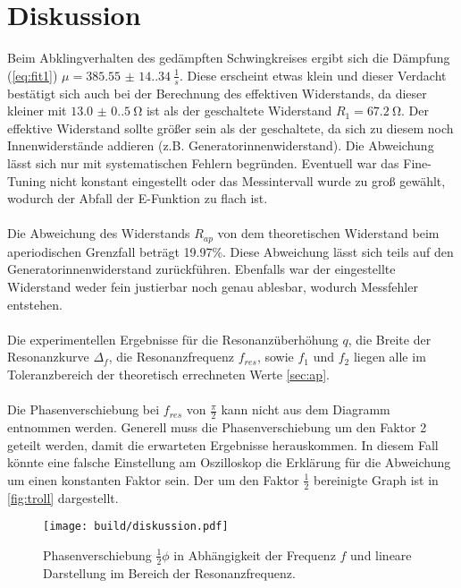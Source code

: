\section{Diskussion}
\label{sec:Diskussion}
Beim Abklingverhalten des gedämpften Schwingkreises ergibt sich die Dämpfung (\autoref{eq:fit1}) 
$\mu = \SI{385.55(14.34)}{\frac{1}{s}}$. Diese erscheint etwas klein und dieser Verdacht
bestätigt sich auch bei der Berechnung des effektiven Widerstands, da dieser kleiner mit
$\SI{13.0(0.5)}{\ohm}$ ist als der geschaltete Widerstand $R_1 = \SI{67.2}{\ohm}$.
Der effektive Widerstand sollte größer sein als der geschaltete, da sich zu diesem noch
Innenwiderstände addieren (z.B. Generatorinnenwiderstand). Die Abweichung lässt sich nur mit
systematischen Fehlern begründen. Eventuell war das Fine-Tuning nicht konstant eingestellt
oder das Messintervall wurde zu groß gewählt, wodurch der Abfall der E-Funktion zu flach ist.
\\
\\
Die Abweichung des Widerstands $R_{ap}$ von dem theoretischen Widerstand beim aperiodischen
Grenzfall beträgt 19.97\%. Diese Abweichung lässt sich teils auf den Generatorinnenwiderstand
zurückführen. Ebenfalls war der eingestellte Widerstand weder fein justierbar noch genau ablesbar, 
wodurch Messfehler entstehen.
\\
\\
Die experimentellen Ergebnisse für die Resonanzüberhöhung $q$, die Breite der Resonanzkurve 
$\Delta_f$, die Resonanzfrequenz $f_{res}$, sowie $f_1$ und $f_2$ liegen alle im Toleranzbereich
der theoretisch errechneten Werte \autoref{sec:ap}.
\\
\\
Die Phasenverschiebung bei $f_{res}$ von $\frac{\pi}{2}$ kann nicht aus dem Diagramm entnommen werden.
Generell muss die Phasenverschiebung um den Faktor 2 geteilt werden, damit die erwarteten 
Ergebnisse herauskommen. In diesem Fall könnte eine falsche Einstellung am Oszilloskop
die Erklärung für die Abweichung um einen konstanten Faktor sein.
Der um den Faktor $\frac{1}{2}$ bereinigte Graph ist in \autoref{fig:troll} dargestellt.
\begin{figure}[H]
    \texttt{[image: build/diskussion.pdf]}
    \caption{Phasenverschiebung $\frac{1}{2}\phi$ in Abhängigkeit der Frequenz $f$ und lineare Darstellung im Bereich der Resonanzfrequenz.}
    \label{fig:troll}
  \end{figure}
